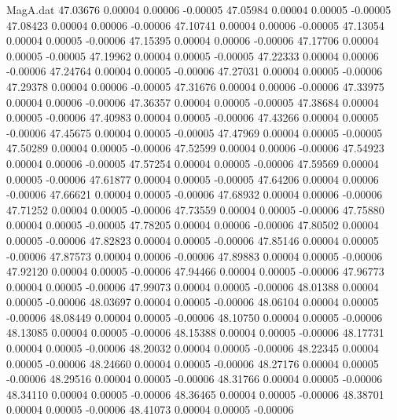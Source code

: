 \begin{filecontents}{MagA.dat}
  47.03676    0.00004    0.00006   -0.00005
  47.05984    0.00004    0.00005   -0.00005
  47.08423    0.00004    0.00006   -0.00006
  47.10741    0.00004    0.00006   -0.00005
  47.13054    0.00004    0.00005   -0.00006
  47.15395    0.00004    0.00006   -0.00006
  47.17706    0.00004    0.00005   -0.00005
  47.19962    0.00004    0.00005   -0.00005
  47.22333    0.00004    0.00006   -0.00006
  47.24764    0.00004    0.00005   -0.00006
  47.27031    0.00004    0.00005   -0.00006
  47.29378    0.00004    0.00006   -0.00005
  47.31676    0.00004    0.00006   -0.00006
  47.33975    0.00004    0.00006   -0.00006
  47.36357    0.00004    0.00005   -0.00005
  47.38684    0.00004    0.00005   -0.00006
  47.40983    0.00004    0.00005   -0.00006
  47.43266    0.00004    0.00005   -0.00006
  47.45675    0.00004    0.00005   -0.00005
  47.47969    0.00004    0.00005   -0.00005
  47.50289    0.00004    0.00005   -0.00006
  47.52599    0.00004    0.00006   -0.00006
  47.54923    0.00004    0.00006   -0.00005
  47.57254    0.00004    0.00005   -0.00006
  47.59569    0.00004    0.00005   -0.00006
  47.61877    0.00004    0.00005   -0.00005
  47.64206    0.00004    0.00006   -0.00006
  47.66621    0.00004    0.00005   -0.00006
  47.68932    0.00004    0.00006   -0.00006
  47.71252    0.00004    0.00005   -0.00006
  47.73559    0.00004    0.00005   -0.00006
  47.75880    0.00004    0.00005   -0.00005
  47.78205    0.00004    0.00006   -0.00006
  47.80502    0.00004    0.00005   -0.00006
  47.82823    0.00004    0.00005   -0.00006
  47.85146    0.00004    0.00005   -0.00006
  47.87573    0.00004    0.00006   -0.00006
  47.89883    0.00004    0.00005   -0.00006
  47.92120    0.00004    0.00005   -0.00006
  47.94466    0.00004    0.00005   -0.00006
  47.96773    0.00004    0.00005   -0.00006
  47.99073    0.00004    0.00005   -0.00006
  48.01388    0.00004    0.00005   -0.00006
  48.03697    0.00004    0.00005   -0.00006
  48.06104    0.00004    0.00005   -0.00006
  48.08449    0.00004    0.00005   -0.00006
  48.10750    0.00004    0.00005   -0.00006
  48.13085    0.00004    0.00005   -0.00006
  48.15388    0.00004    0.00005   -0.00006
  48.17731    0.00004    0.00005   -0.00006
  48.20032    0.00004    0.00005   -0.00006
  48.22345    0.00004    0.00005   -0.00006
  48.24660    0.00004    0.00005   -0.00006
  48.27176    0.00004    0.00005   -0.00006
  48.29516    0.00004    0.00005   -0.00006
  48.31766    0.00004    0.00005   -0.00006
  48.34110    0.00004    0.00005   -0.00006
  48.36465    0.00004    0.00005   -0.00006
  48.38701    0.00004    0.00005   -0.00006
  48.41073    0.00004    0.00005   -0.00006

\end{filecontents}
